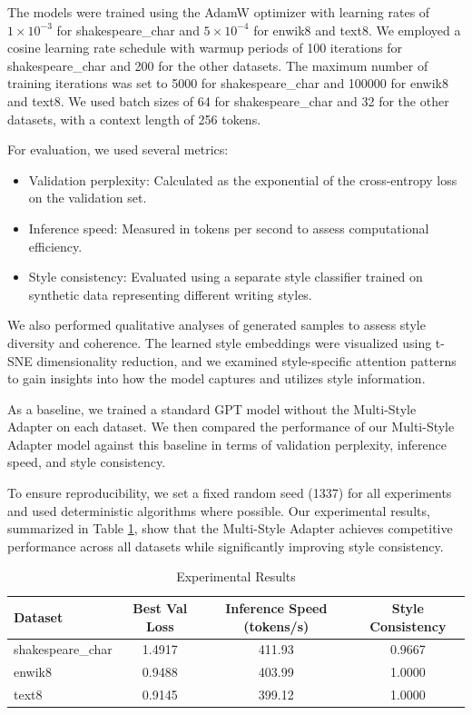 \documentclass{article} %
\begin{document}
The models were trained using the AdamW optimizer with learning rates of $1 \times 10^{-3}$ for shakespeare\_char and $5 \times 10^{-4}$ for enwik8 and text8. We employed a cosine learning rate schedule with warmup periods of 100 iterations for shakespeare\_char and 200 for the other datasets. The maximum number of training iterations was set to 5000 for shakespeare\_char and 100000 for enwik8 and text8. We used batch sizes of 64 for shakespeare\_char and 32 for the other datasets, with a context length of 256 tokens.

For evaluation, we used several metrics:
\begin{itemize}
    \item Validation perplexity: Calculated as the exponential of the cross-entropy loss on the validation set.
    \item Inference speed: Measured in tokens per second to assess computational efficiency.
    \item Style consistency: Evaluated using a separate style classifier trained on synthetic data representing different writing styles.
\end{itemize}

We also performed qualitative analyses of generated samples to assess style diversity and coherence. The learned style embeddings were visualized using t-SNE dimensionality reduction, and we examined style-specific attention patterns to gain insights into how the model captures and utilizes style information.

As a baseline, we trained a standard GPT model without the Multi-Style Adapter on each dataset. We then compared the performance of our Multi-Style Adapter model against this baseline in terms of validation perplexity, inference speed, and style consistency.

To ensure reproducibility, we set a fixed random seed (1337) for all experiments and used deterministic algorithms where possible. Our experimental results, summarized in Table \ref{tab:results}, show that the Multi-Style Adapter achieves competitive performance across all datasets while significantly improving style consistency.

\begin{table}[h]
\centering
\caption{Experimental Results}
\label{tab:results}
\begin{tabular}{lccc}
\toprule
Dataset & Best Val Loss & Inference Speed (tokens/s) & Style Consistency \\
\midrule
shakespeare\_char & 1.4917 & 411.93 & 0.9667 \\
enwik8 & 0.9488 & 403.99 & 1.0000 \\
text8 & 0.9145 & 399.12 & 1.0000 \\
\bottomrule
\end{tabular}
\end{table}
\end{document}
